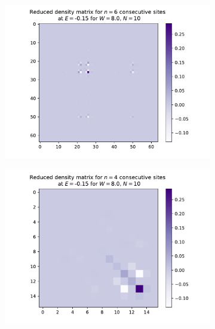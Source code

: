 \documentclass[reprint,amsmath,amssymb,aps,prb]{revtex4-2}
\begin{document}
\begin{center}
	\begin{figure}[h!]
		\centering	
		\begin{subfigure}[c]{0.45\textwidth}
			\includegraphics[width=\linewidth]{../results/groundstates/N10n6_trainingset_groundstate_Wmax8.0}
		\end{subfigure}
		\begin{subfigure}[c]{0.45\textwidth}
			\includegraphics[width=\linewidth]{../results/groundstates/N10n4_trainingset_groundstate_Wmax8.0}

\end{subfigure}
\end{figure}
\end{center}
\end{document}
